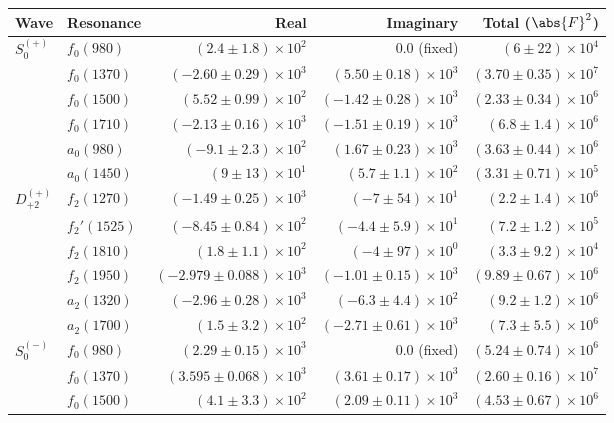 \begin{table}
    \begin{center}
        \begin{tabular}{llrrr}\toprule
        Wave & Resonance & Real & Imaginary & Total ($\abs{F}^2$) \\\midrule
$S_{0}^{(+)}$ & $f_{0}(980)$ & $(2.4 \pm 1.8) \times 10^{2}$ & $0.0$ (fixed) & $(6 \pm 22) \times 10^{4}$ \\
 & $f_{0}(1370)$ & $(-2.60 \pm 0.29) \times 10^{3}$ & $(5.50 \pm 0.18) \times 10^{3}$ & $(3.70 \pm 0.35) \times 10^{7}$ \\
 & $f_{0}(1500)$ & $(5.52 \pm 0.99) \times 10^{2}$ & $(-1.42 \pm 0.28) \times 10^{3}$ & $(2.33 \pm 0.34) \times 10^{6}$ \\
 & $f_{0}(1710)$ & $(-2.13 \pm 0.16) \times 10^{3}$ & $(-1.51 \pm 0.19) \times 10^{3}$ & $(6.8 \pm 1.4) \times 10^{6}$ \\
 & $a_{0}(980)$ & $(-9.1 \pm 2.3) \times 10^{2}$ & $(1.67 \pm 0.23) \times 10^{3}$ & $(3.63 \pm 0.44) \times 10^{6}$ \\
 & $a_{0}(1450)$ & $(9 \pm 13) \times 10^{1}$ & $(5.7 \pm 1.1) \times 10^{2}$ & $(3.31 \pm 0.71) \times 10^{5}$ \\
$D_{+2}^{(+)}$ & $f_{2}(1270)$ & $(-1.49 \pm 0.25) \times 10^{3}$ & $(-7 \pm 54) \times 10^{1}$ & $(2.2 \pm 1.4) \times 10^{6}$ \\
 & $f_{2}'(1525)$ & $(-8.45 \pm 0.84) \times 10^{2}$ & $(-4.4 \pm 5.9) \times 10^{1}$ & $(7.2 \pm 1.2) \times 10^{5}$ \\
 & $f_{2}(1810)$ & $(1.8 \pm 1.1) \times 10^{2}$ & $(-4 \pm 97) \times 10^{0}$ & $(3.3 \pm 9.2) \times 10^{4}$ \\
 & $f_{2}(1950)$ & $(-2.979 \pm 0.088) \times 10^{3}$ & $(-1.01 \pm 0.15) \times 10^{3}$ & $(9.89 \pm 0.67) \times 10^{6}$ \\
 & $a_{2}(1320)$ & $(-2.96 \pm 0.28) \times 10^{3}$ & $(-6.3 \pm 4.4) \times 10^{2}$ & $(9.2 \pm 1.2) \times 10^{6}$ \\
 & $a_{2}(1700)$ & $(1.5 \pm 3.2) \times 10^{2}$ & $(-2.71 \pm 0.61) \times 10^{3}$ & $(7.3 \pm 5.5) \times 10^{6}$ \\
$S_{0}^{(-)}$ & $f_{0}(980)$ & $(2.29 \pm 0.15) \times 10^{3}$ & $0.0$ (fixed) & $(5.24 \pm 0.74) \times 10^{6}$ \\
 & $f_{0}(1370)$ & $(3.595 \pm 0.068) \times 10^{3}$ & $(3.61 \pm 0.17) \times 10^{3}$ & $(2.60 \pm 0.16) \times 10^{7}$ \\
 & $f_{0}(1500)$ & $(4.1 \pm 3.3) \times 10^{2}$ & $(2.09 \pm 0.11) \times 10^{3}$ & $(4.53 \pm 0.67) \times 10^{6}$ \\

\end{tabular}
\end{center}
\end{table}
